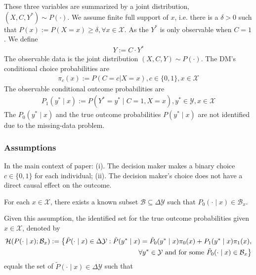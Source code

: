\documentclass[11pt]{elegantbook}
\begin{document}
These three variables are summarized by a joint distribution, $(X,C,Y^*)\sim P(\cdot)$. We assume finite full support of $x$, i.e. there is a $\delta>0$ such that $P(x):=P(X=x)\geq \delta,\forall x\in \mathcal{X}$. As the $Y^*$ is only observable when $C=1$. We define
\begin{equation}
    \begin{aligned}
        Y:=C\cdot Y^*
    \end{aligned}
    \nonumber
\end{equation}
The observable data is the joint distribution $(X,C,Y)\sim P(\cdot)$. The DM's conditional choice probabilities are
\begin{equation}
    \begin{aligned}
        \pi_c(x):=P(C=c|X=x),c\in\{0,1\},x\in \mathcal{X}
    \end{aligned}
    \nonumber
\end{equation}
The observable conditional outcome probabilities are
\begin{equation}
    \begin{aligned}
        P_1(y^*\mid x):=P(Y^*=y^*\mid C=1, X=x),y^*\in \mathcal{Y},x\in \mathcal{X}
    \end{aligned}
    \nonumber
\end{equation}
The $P_0(y^*\mid x)$ and the true outcome probabilities $P(y^*\mid x)$ are not identified due to the missing-data problem.

\subsubsection*{Assumptions}
\begin{note}
    In the main context of paper: (i). The decision maker makes a binary choice $c\in\{0,1\}$ for each individual; (ii). The decision maker's choice does not have a direct causal effect on the outcome.
\end{note}

\begin{assumption}
    For each $x\in \mathcal{X}$, there exists a known subset $\mathcal{B}\subseteq \Delta \mathcal{Y}$ such that $P_0(\cdot\mid x)\in \mathcal{B}_x$.
\end{assumption}
Given this assumption, the identified set for the true outcome probabilities given $x\in \mathcal{X}$, denoted by
\begin{equation}
    \begin{aligned}
        \mathcal{H}(P(\cdot\mid x);\mathcal{B}_x):=\big\{\tilde{P}(\cdot\mid x)\in\Delta \mathcal{Y}: \tilde{P}(y^*\mid x)=\tilde{P}_0(y^*\mid x)\pi_0(x)+P_1(y^*\mid x)\pi_1(x),\\
        \forall y^*\in \mathcal{Y} \textnormal{ and for some } \tilde{P}_0(\cdot\mid x)\in \mathcal{B}_x\big\}
    \end{aligned}
    \nonumber
\end{equation}
equals the set of $\tilde{P}(\cdot\mid x)\in\Delta \mathcal{Y}$ such that 





\appendix











\end{document}

